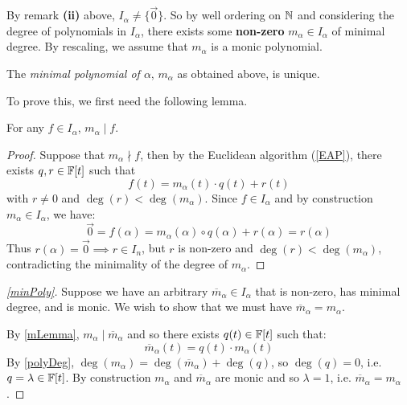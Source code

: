 \documentclass[../main.tex]{subfiles}
\begin{document}
By remark \textbf{(ii)} above, $I_{\alpha} \neq \{\vec{0}\}$.
So by well ordering on $\mathbb{N}$ and considering the degree of polynomials in $I_{\alpha}$, there exists some \textbf{non-zero} $m_{\alpha} \in I_{\alpha}$ of minimal degree.
By rescaling, we assume that $m_{\alpha}$ is a monic polynomial.
\begin{proposition}
  The \textit{minimal polynomial of $\alpha$}, $m_{\alpha}$ as obtained above, is unique. \label{minPoly}
\end{proposition}
To prove this, we first need the following lemma.
\begin{lemma}
  For any $f \in I_{\alpha}$, $m_{\alpha} \mid f$. \label{mLemma}
\end{lemma}
\begin{proof}
  Suppose that $m_{\alpha} \nmid f$, then by the Euclidean algorithm (\cref{EAP}), there exists $q, r \in \mathbb{F}[t]$ such that
  \[
    f(t) = m_{\alpha}(t) \cdot q(t) + r(t)
  \]
  with $r \neq 0$ and $\deg(r) < \deg(m_{\alpha})$.
  Since $f \in I_{\alpha}$ and by construction $m_{\alpha} \in I_{\alpha}$, we have:
  \[
    \vec{0} = f(\alpha) = m_{\alpha}(\alpha) \circ q(\alpha) + r(\alpha) = r(\alpha)
  \]
  Thus $r(\alpha) = \vec{0} \implies r \in I_n$, but $r$ is non-zero and $\deg(r) < \deg(m_{\alpha})$, contradicting the minimality of the degree of $m_{\alpha}$.
\end{proof}
\begin{proof}[\cref{minPoly}]
  Suppose we have an arbitrary $\overline{m}_{\alpha} \in I_{\alpha}$ that is non-zero, has minimal degree, and is monic.
  We wish to show that we must have $\overline{m}_{\alpha} = m_{\alpha}$.

  By \cref{mLemma}, $m_{\alpha} \mid \overline{m}_{\alpha}$ and so there exists $q(t) \in \mathbb{F}[t]$ such that:
  \[
    \overline{m}_{\alpha}(t) = q(t) \cdot m_{\alpha}(t)
  \]
  By \cref{polyDeg}, $\deg(m_{\alpha}) = \deg(\overline{m}_{\alpha}) + \deg(q)$, so $\deg(q) = 0$, i.e. $q = \lambda \in \mathbb{F}[t]$.
  By construction $m_{\alpha}$ and $\overline{m}_{\alpha}$ are monic and so $\lambda = 1$, i.e. $\overline{m}_{\alpha} = m_{\alpha}$.
\end{proof}
\end{document}
